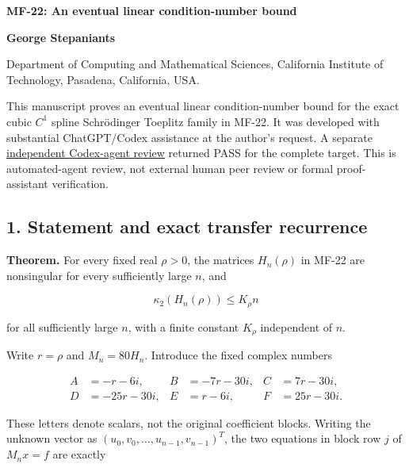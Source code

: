 \documentclass[10pt,a4paper]{article}
\begin{document}
{\raggedright\Large\bfseries MF-22: An eventual linear condition-number
bound\par}
\vspace{0.4em}
{\normalsize\bfseries George Stepaniants\par}
{\small Department of Computing and Mathematical Sciences, California
Institute of Technology, Pasadena, California, USA.\par}
\vspace{0.6em}
\pagestyle{plain}
\setlength{\abovedisplayskip}{6pt}
\setlength{\belowdisplayskip}{6pt}
\setlength{\abovedisplayshortskip}{4pt}
\setlength{\belowdisplayshortskip}{4pt}

This manuscript proves an eventual linear condition-number bound for the
exact cubic \(C^1\) spline Schrödinger Toeplitz family in MF-22. It was
developed with substantial ChatGPT/Codex assistance at the author's
request. A separate
\href{https://github.com/ajt60gaibb/OpenProblemsInNLA/blob/main/references/stepaniants-mf22-2026-09-11/verification/MF-22-independent-review.md}{independent
Codex-agent review} returned PASS for the complete target. This is
automated-agent review, not external human peer review or formal
proof-assistant verification.

\subsection{1. Statement and exact transfer
recurrence}\label{statement-and-exact-transfer-recurrence}

\textbf{Theorem.} For every fixed real \(\rho>0\), the matrices
\(H_n(\rho)\) in MF-22 are nonsingular for every sufficiently large
\(n\), and

\nopagebreak[4]

\[
\kappa_2(H_n(\rho))\le K_\rho n
\]

for all sufficiently large \(n\), with a finite constant \(K_\rho\)
independent of \(n\).

Write \(r=\rho\) and \(M_n=80H_n\). Introduce the fixed complex numbers

\nopagebreak[4]

\[
\begin{aligned}
A&=-r-6i,& B&=-7r-30i,& C&=7r-30i,\\
D&=-25r-30i,& E&=r-6i,& F&=25r-30i.
\end{aligned}
\]

These letters denote scalars, not the original coefficient blocks.
Writing the unknown vector as \((u_0,v_0,\ldots,u_{n-1},v_{n-1})^T\),
the two equations in block row \(j\) of \(M_nx=f\) are exactly
\end{document}
